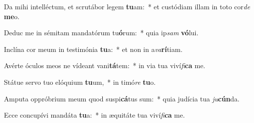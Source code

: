\item Da mihi intelléctum, et scrutábor legem \textbf{tu}am:~* et custódiam illam in toto cor\textit{de} \textbf{me}o.
\item Deduc me in sémitam mandatórum tu\textbf{ó}rum:~* quia ip\textit{sam} \textbf{vó}lui.
\item Inclína cor meum in testimónia \textbf{tu}a:~* et non in a\textit{va}\textbf{rí}tiam.
\item Avérte óculos meos ne vídeant vani\textbf{tá}tem:~* in via tua viví\textit{fi}\textbf{ca} me.
\item Státue servo tuo elóquium \textbf{tu}um,~* in timó\textit{re} \textbf{tu}o.
\item Amputa oppróbrium meum quod suspi\textbf{cá}tus sum:~* quia judícia tua \textit{ju}\textbf{cún}da.
\item Ecce concupívi mandáta \textbf{tu}a:~* in æquitáte tua viví\textit{fi}\textbf{ca} me.
